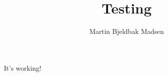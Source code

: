 \documentclass{beamer}
\title{Testing}
\author{Martin Bjeldbak Madsen}
\begin{document}
  {%
    \frame{\titlepage}
  }

  \begin{frame}
    It's working!
  \end{frame}
\end{document}
